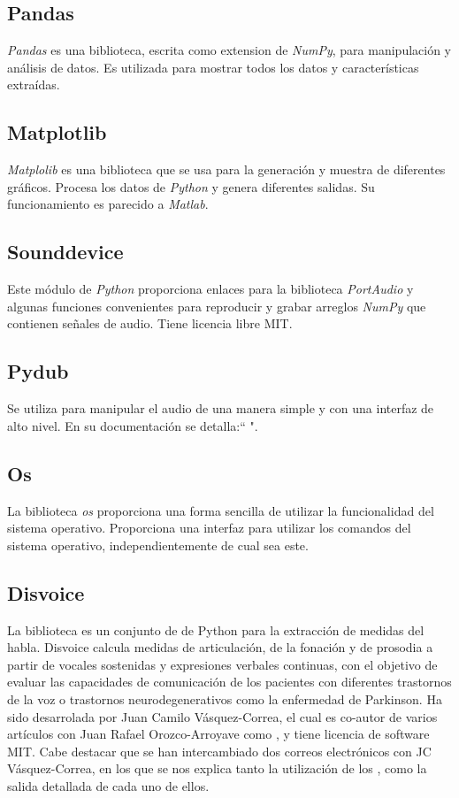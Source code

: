 \subsection{Pandas}
\textit{Pandas} \cite{tool:pandas} es una biblioteca, escrita como extension de \textit{NumPy}, para manipulación y análisis de datos. Es utilizada para mostrar todos los datos y características extraídas.

\subsection{Matplotlib}
\textit{Matplolib} \cite{tool:matplotlib} es una biblioteca que se usa para la generación y muestra de diferentes gráficos. Procesa los datos de \textit{Python} y genera diferentes salidas. Su funcionamiento es parecido a \textit{Matlab}.

\subsection{Sounddevice}
Este módulo de \textit{Python} proporciona enlaces para la biblioteca \textit{PortAudio} y algunas funciones convenientes para reproducir y grabar arreglos \textit{NumPy} que contienen señales de audio. Tiene licencia libre MIT.

\subsection{Pydub}
Se utiliza para manipular el audio de una manera simple y con una interfaz de alto nivel. En su documentación se detalla:``  ".

\subsection{Os}
La biblioteca \textit{os} proporciona una forma sencilla de utilizar la funcionalidad del sistema operativo. Proporciona una interfaz para utilizar los comandos del sistema operativo, independientemente de cual sea este.

\subsection{Disvoice}
La biblioteca   \cite{neurospeech} es un conjunto de  de Python para la extracción de medidas del habla. Disvoice calcula medidas de articulación, de la fonación y de prosodia a partir de vocales sostenidas y expresiones verbales continuas, con el objetivo de evaluar las capacidades de comunicación de los pacientes con diferentes trastornos de la voz o trastornos neurodegenerativos como la enfermedad de Parkinson. Ha sido desarrolada por Juan Camilo Vásquez-Correa, el cual es co-autor de varios artículos con Juan Rafael Orozco-Arroyave como \cite{neurospeech}, y tiene licencia de software MIT. Cabe destacar que se han intercambiado dos correos electrónicos con JC Vásquez-Correa, en los que se nos explica tanto la utilización de los , como la salida detallada de cada uno de ellos.

